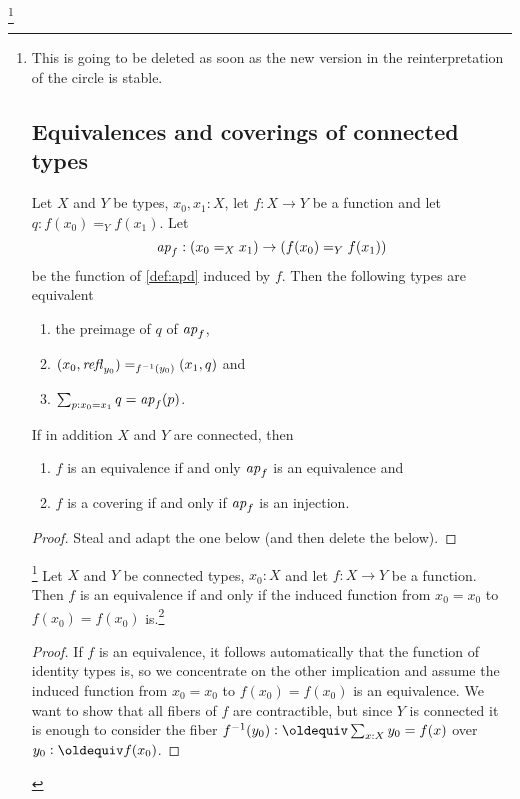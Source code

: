 \footnote{This is going to be deleted as soon as the new version in the reinterpretation of the circle is stable.\tiny
\subsection{Equivalences and coverings of connected types}
\label{sec:eqconntypes}

\begin{lemma}
  \label{lem:eqandcovofconntypes}
  Let $X$ and $Y$ be types, $x_0,x_1:X$, let $f:X\to Y$ be a function and let $q:f(x_0)=_Yf(x_1)$. Let 
    $$%
\ap f:(x_0=_Xx_1)\to (f(x_0)=_Yf(x_1))$$
be the function of \cref{def:apd} induced by $f$.  Then the following types are equivalent
  \begin{enumerate}
  \item the preimage of $q$ of $\mathop{{\it ap}_{f}}$,  
  \item $(x_0,\mathop{{\it refl}_{y_0}})=_{f^{-1}(y_0)}(x_1,q)$ and
  \item $\sum_{p:x_0=x_1}q=\mathop{{\it ap}_{f}}(p)$.
  \end{enumerate}
If in addition $X$ and $Y$ are connected, then
\begin{enumerate}
\item $f$ is an equivalence if and only $\ap f%
$ is an equivalence and
\item $f$ is a covering if and only if  $\ap f%
$ is an injection.
\end{enumerate}

\end{lemma}
\begin{proof}
  Steal and adapt the one below (and then delete the below).
\end{proof}

\begin{lemma}\label{lem:eqofconntypes}\footnote{
Essentially it is our version of ``a group homomorphism is an isomorphism iff it is a bijection'': proofread}
  Let $X$ and $Y$ be connected types, $x_0:X$ and let $f:X\to Y$ be a function.  Then $f$ is an equivalence if and only if the induced function from $x_0=x_0$ to $f(x_0)=f(x_0)$ is.\footnote{note to self: try to be consistent in writing equalities with right variance (as I hope I have managed to do here)}
\end{lemma}
\begin{proof}
  If $f$ is an equivalence, it follows automatically that the function of identity types is, so we concentrate on the other implication and assume the induced function from $x_0=x_0$ to $f(x_0)=f(x_0)$ is an equivalence.  We want to show that all fibers of $f$ are contractible, but since $Y$ is connected it is enough to consider the fiber $f^{-1}(y_0)\defequi\sum_{x:X}y_0=f(x)$ over $y_0\defequi f(x_0)$.  


\end{proof}}
